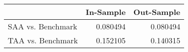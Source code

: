 \begin{tabular}{lrr}
\toprule
{} &  In-Sample &  Out-Sample \\
\midrule
SAA vs. Benchmark &   0.080494 &    0.080494 \\
TAA vs. Benchmark &   0.152105 &    0.140315 \\
\bottomrule
\end{tabular}
